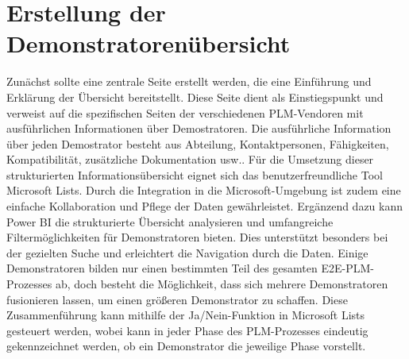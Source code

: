 \section{Erstellung der Demonstratorenübersicht}
Zunächst sollte eine zentrale Seite erstellt werden, die eine Einführung und Erklärung der Übersicht bereitstellt. Diese Seite dient als Einstiegspunkt und verweist auf die spezifischen Seiten der verschiedenen PLM-Vendoren mit ausführlichen Informationen über Demostratoren. Die ausführliche Information über jeden Demostrator besteht aus Abteilung, Kontaktpersonen, Fähigkeiten, Kompatibilität, zusätzliche Dokumentation usw.. Für die Umsetzung dieser strukturierten Informationsübersicht eignet sich das benutzerfreundliche Tool Microsoft Lists.\cite{List} Durch die Integration in die Microsoft-Umgebung ist zudem eine einfache Kollaboration und Pflege der Daten gewährleistet.\newline
Ergänzend dazu kann Power BI \cite{Power_BI} die strukturierte Übersicht analysieren und umfangreiche Filtermöglichkeiten für Demonstratoren bieten. Dies unterstützt besonders bei der gezielten Suche und erleichtert die Navigation durch die Daten.
Einige Demonstratoren bilden nur einen bestimmten Teil des gesamten E2E-PLM-Prozesses ab, doch besteht die Möglichkeit, dass sich mehrere Demonstratoren fusionieren lassen, um einen größeren Demonstrator zu schaffen. Diese Zusammenführung kann mithilfe der Ja/Nein-Funktion in Microsoft Lists gesteuert werden, wobei kann in jeder Phase des PLM-Prozesses eindeutig gekennzeichnet werden, ob ein Demonstrator die jeweilige Phase vorstellt.
